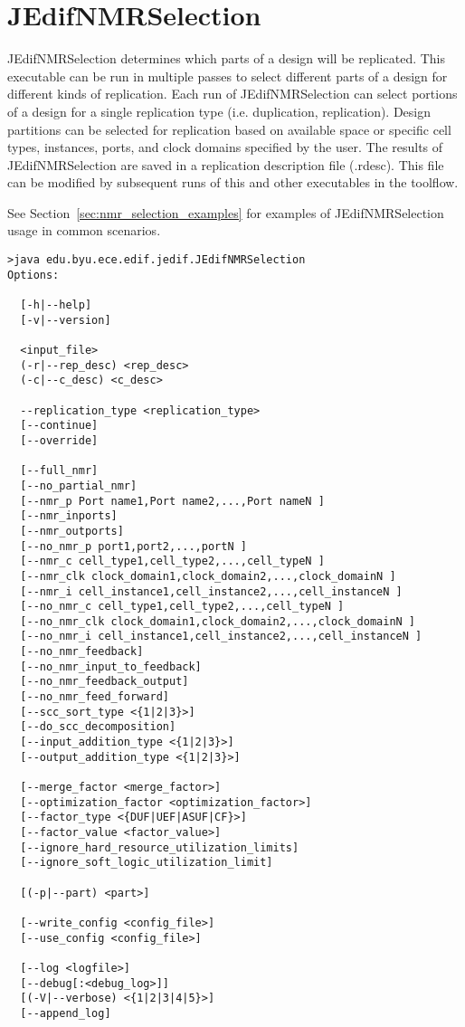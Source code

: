 \section{JEdifNMRSelection}
JEdifNMRSelection determines which parts of a design will be
replicated. This executable can be run in multiple passes to select
different parts of a design for different kinds of replication. Each
run of JEdifNMRSelection can select portions of a design for a single
replication type (i.e. duplication, replication). Design partitions can
be selected for replication based on available space or specific cell
types, instances, ports, and clock domains specified by the user. The
results of JEdifNMRSelection are saved in a replication description
file (.rdesc). This file can be modified by subsequent runs of this
and other executables in the toolflow.

See Section~\ref{sec:nmr_selection_examples} for examples of JEdifNMRSelection
usage in common scenarios.

\begin{verbatim}
>java edu.byu.ece.edif.jedif.JEdifNMRSelection
Options:

  [-h|--help]
  [-v|--version]

  <input_file>
  (-r|--rep_desc) <rep_desc>
  (-c|--c_desc) <c_desc>

  --replication_type <replication_type>
  [--continue]
  [--override]

  [--full_nmr]
  [--no_partial_nmr]
  [--nmr_p Port name1,Port name2,...,Port nameN ]
  [--nmr_inports]
  [--nmr_outports]
  [--no_nmr_p port1,port2,...,portN ]
  [--nmr_c cell_type1,cell_type2,...,cell_typeN ]
  [--nmr_clk clock_domain1,clock_domain2,...,clock_domainN ]
  [--nmr_i cell_instance1,cell_instance2,...,cell_instanceN ]
  [--no_nmr_c cell_type1,cell_type2,...,cell_typeN ]
  [--no_nmr_clk clock_domain1,clock_domain2,...,clock_domainN ]
  [--no_nmr_i cell_instance1,cell_instance2,...,cell_instanceN ]
  [--no_nmr_feedback]
  [--no_nmr_input_to_feedback]
  [--no_nmr_feedback_output]
  [--no_nmr_feed_forward]
  [--scc_sort_type <{1|2|3}>]
  [--do_scc_decomposition]
  [--input_addition_type <{1|2|3}>]
  [--output_addition_type <{1|2|3}>]

  [--merge_factor <merge_factor>]
  [--optimization_factor <optimization_factor>]
  [--factor_type <{DUF|UEF|ASUF|CF}>]
  [--factor_value <factor_value>]
  [--ignore_hard_resource_utilization_limits]
  [--ignore_soft_logic_utilization_limit]

  [(-p|--part) <part>]

  [--write_config <config_file>]
  [--use_config <config_file>]

  [--log <logfile>]
  [--debug[:<debug_log>]]
  [(-V|--verbose) <{1|2|3|4|5}>]
  [--append_log]
\end{verbatim}

